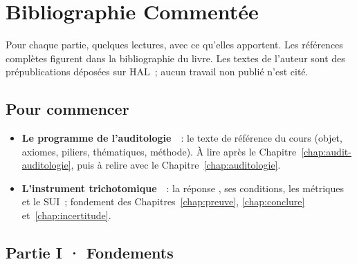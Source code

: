 
\chapter{Bibliographie Commentée}
\label{ann:bibliographie}

Pour chaque partie, quelques lectures, avec ce qu'elles apportent. Les
références complètes figurent dans la bibliographie du livre. Les textes
de l'auteur sont des prépublications déposées sur HAL~; aucun travail non
publié n'est cité.

\section*{Pour commencer}

\begin{itemize}
    \item \textbf{Le programme de l'auditologie}~\cite{minka2026auditologie}~:
          le texte de référence du cours (objet, axiomes, piliers,
          thématiques, méthode). À lire après le
          Chapitre~\ref{chap:audit-auditologie}, puis à relire avec le
          Chapitre~\ref{chap:auditologie}.
    \item \textbf{L'instrument trichotomique}~\cite{minka2026nek}~: la
          réponse \NEK{}, ses conditions, les métriques et le SUI~;
          fondement des Chapitres~\ref{chap:preuve}, \ref{chap:conclure}
          et~\ref{chap:incertitude}.
\end{itemize}

\section*{Partie I · Fondements}

